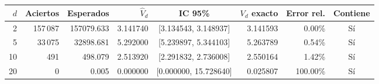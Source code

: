 \begin{tabular}{rrrrcrrc}
\toprule
$d$ & Aciertos & Esperados & $\hat V_d$ & IC 95\% & $V_d$ exacto & Error rel. & Contiene \\
\midrule
2 & 157\,087 & 157079.633 & 3.141740 & [3.134543, 3.148937] & 3.141593 & 0.00\% & Sí \\
5 & 33\,075 & 32898.681 & 5.292000 & [5.239897, 5.344103] & 5.263789 & 0.54\% & Sí \\
10 & 491 & 498.079 & 2.513920 & [2.291832, 2.736008] & 2.550164 & 1.42\% & Sí \\
20 & 0 & 0.005 & 0.000000 & [0.000000, 15.728640] & 0.025807 & 100.00\% & Sí \\
\bottomrule
\end{tabular}
